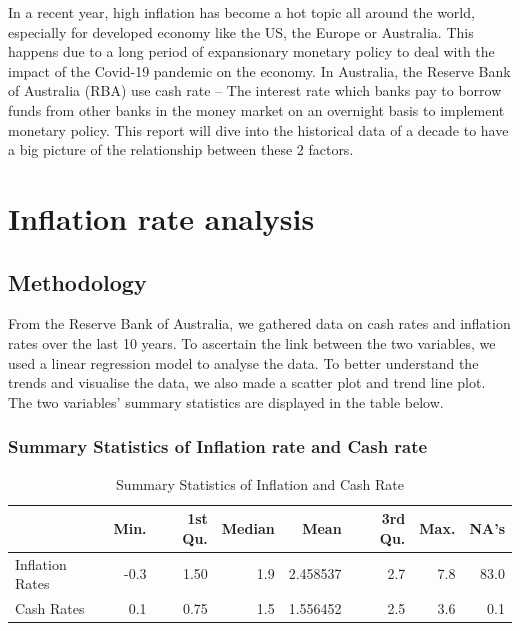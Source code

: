 \documentclass[11pt,a4paper,]{article}
\begin{document}
In a recent year, high inflation has become a hot topic all around the world, especially for developed economy like the US, the Europe or Australia. This happens due to a long period of expansionary monetary policy to deal with the impact of the Covid-19 pandemic on the economy. In Australia, the Reserve Bank of Australia (RBA) use cash rate -- The interest rate which banks pay to borrow funds from other banks in the money market on an overnight basis to implement monetary policy. This report will dive into the historical data of a decade to have a big picture of the relationship between these 2 factors.

\hypertarget{inflation-rate-analysis}{%
\section{Inflation rate analysis}\label{inflation-rate-analysis}}

\hypertarget{methodology}{%
\subsection{Methodology}\label{methodology}}

From the Reserve Bank of Australia, we gathered data on cash rates and inflation rates over the last 10 years. To ascertain the link between the two variables, we used a linear regression model to analyse the data. To better understand the trends and visualise the data, we also made a scatter plot and trend line plot. The two variables' summary statistics are displayed in the table below.

\hypertarget{summary-statistics-of-inflation-rate-and-cash-rate}{%
\subsubsection{Summary Statistics of Inflation rate and Cash rate}\label{summary-statistics-of-inflation-rate-and-cash-rate}}

\begin{table}

\caption{\label{tab:CashRatesVSInflation}Summary Statistics of Inflation and Cash Rate}
\centering
\begin{tabular}[t]{lrrrrrrr}
\toprule
  & Min. & 1st Qu. & Median & Mean & 3rd Qu. & Max. & NA's\\
\midrule
Inflation Rates & -0.3 & 1.50 & 1.9 & 2.458537 & 2.7 & 7.8 & 83.0\\
Cash Rates & 0.1 & 0.75 & 1.5 & 1.556452 & 2.5 & 3.6 & 0.1\\
\bottomrule
\end{tabular}
\end{table}
\end{document}
